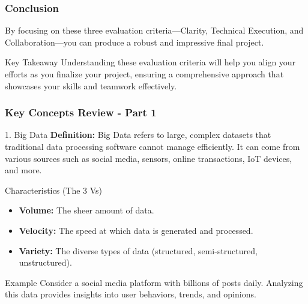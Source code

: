 \documentclass[aspectratio=169]{beamer}
\begin{document}
\begin{frame}
    \frametitle{Conclusion}
    By focusing on these three evaluation criteria—Clarity, Technical Execution, and Collaboration—you can produce a robust and impressive final project. 
    \begin{block}{Key Takeaway}
        Understanding these evaluation criteria will help you align your efforts as you finalize your project, ensuring a comprehensive approach that showcases your skills and teamwork effectively.
    \end{block}
\end{frame}

\begin{frame}[fragile]
    \frametitle{Key Concepts Review - Part 1}
    \begin{block}{1. Big Data}
        \textbf{Definition:} 
        Big Data refers to large, complex datasets that traditional data processing software cannot manage efficiently. It can come from various sources such as social media, sensors, online transactions, IoT devices, and more.
    \end{block}
    
    \begin{block}{Characteristics (The 3 Vs)}
        \begin{itemize}
            \item \textbf{Volume:} The sheer amount of data.
            \item \textbf{Velocity:} The speed at which data is generated and processed.
            \item \textbf{Variety:} The diverse types of data (structured, semi-structured, unstructured).
        \end{itemize}
    \end{block}

    \begin{block}{Example}
        Consider a social media platform with billions of posts daily. Analyzing this data provides insights into user behaviors, trends, and opinions.
    \end{block}
\end{frame}
\end{document}
